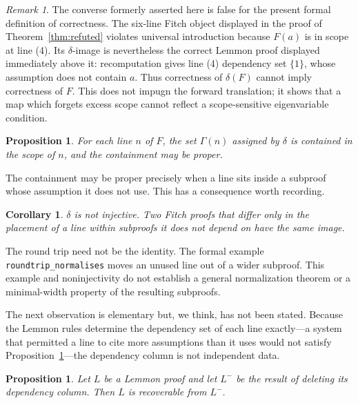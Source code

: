 \documentclass[11pt]{article}
\theoremstyle{plain}
\newtheorem{proposition}[theorem]{Proposition}
\newtheorem{corollary}[theorem]{Corollary}
\theoremstyle{definition}
\theoremstyle{remark}
\newtheorem{remark}[theorem]{Remark}
\begin{document}
\begin{remark}\label{rem:theorem4-converse}
The converse formerly asserted here is false for the present formal definition
of correctness. The six-line Fitch object displayed in the proof of
Theorem~\ref{thm:refuted} violates universal introduction because $F(a)$ is in
scope at line (4). Its $\delta$-image is nevertheless the correct Lemmon proof
displayed immediately above it: recomputation gives line (4) dependency set
$\{1\}$, whose assumption does not contain $a$. Thus correctness of
$\delta(F)$ cannot imply correctness of $F$. This does not impugn the forward
translation; it shows that a map which forgets excess scope cannot reflect a
scope-sensitive eigenvariable condition.
\end{remark}

\begin{proposition}\label{prop:minimal}
For each line $n$ of $F$, the set $\Gamma(n)$ assigned by $\delta$ is
contained in the scope of $n$, and the containment may be proper.
\end{proposition}

The containment may be proper precisely when a line sits inside a subproof
whose assumption it does not use. This has a consequence worth recording.

\begin{corollary}\label{cor:notinjective}
$\delta$ is not injective. Two Fitch proofs that differ only in the placement
of a line within subproofs it does not depend on have the same image.
\end{corollary}

The round trip need not be the identity. The formal example
\verb|roundtrip_normalises| moves an unused line out of a wider subproof.
This example and noninjectivity do not establish a general normalization
theorem or a minimal-width property of the resulting subproofs.

The next observation is elementary but, we think, has not been stated. Because
the Lemmon rules determine the dependency set of each line exactly---a system
that permitted a line to cite more assumptions than it uses would not satisfy
Proposition~\ref{prop:minimal}---the dependency column is not independent
data.

\begin{proposition}\label{prop:redundant}
Let $L$ be a Lemmon proof and let $L^{-}$ be the result of deleting its
dependency column. Then $L$ is recoverable from $L^{-}$.
\end{proposition}
\end{document}
